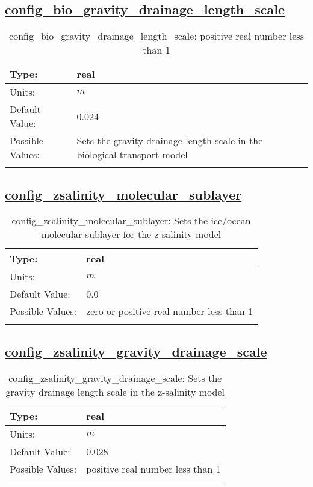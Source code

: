 \subsection[config\_bio\_gravity\_drainage\_length\_scale]{\hyperref[sec:nm_tab_biogeochemistry]{config\_bio\_gravity\_drainage\_length\_scale}}
\label{subsec:nm_sec_config_bio_gravity_drainage_length_scale}
\begin{center}
\begin{longtable}{| p{2.0in} || p{4.0in} |}
    \hline
    Type: & real \\
    \hline
    Units: & $m$ \\
    \hline
    Default Value: & 0.024 \\
    \hline
    Possible Values: & Sets the gravity drainage length scale in the biological transport model \\
    \hline
    \caption{config\_bio\_gravity\_drainage\_length\_scale: positive real number less than 1}
\end{longtable}
\end{center}
\subsection[config\_zsalinity\_molecular\_sublayer]{\hyperref[sec:nm_tab_biogeochemistry]{config\_zsalinity\_molecular\_sublayer}}
\label{subsec:nm_sec_config_zsalinity_molecular_sublayer}
\begin{center}
\begin{longtable}{| p{2.0in} || p{4.0in} |}
    \hline
    Type: & real \\
    \hline
    Units: & $m$ \\
    \hline
    Default Value: & 0.0 \\
    \hline
    Possible Values: & zero or positive real number less than 1 \\
    \hline
    \caption{config\_zsalinity\_molecular\_sublayer: Sets the ice/ocean molecular sublayer for the z-salinity model}
\end{longtable}
\end{center}
\subsection[config\_zsalinity\_gravity\_drainage\_scale]{\hyperref[sec:nm_tab_biogeochemistry]{config\_zsalinity\_gravity\_drainage\_scale}}
\label{subsec:nm_sec_config_zsalinity_gravity_drainage_scale}
\begin{center}
\begin{longtable}{| p{2.0in} || p{4.0in} |}
    \hline
    Type: & real \\
    \hline
    Units: & $m$ \\
    \hline
    Default Value: & 0.028 \\
    \hline
    Possible Values: & positive real number less than 1 \\
    \hline
    \caption{config\_zsalinity\_gravity\_drainage\_scale: Sets the gravity drainage length scale in the z-salinity model}
\end{longtable}
\end{center}

